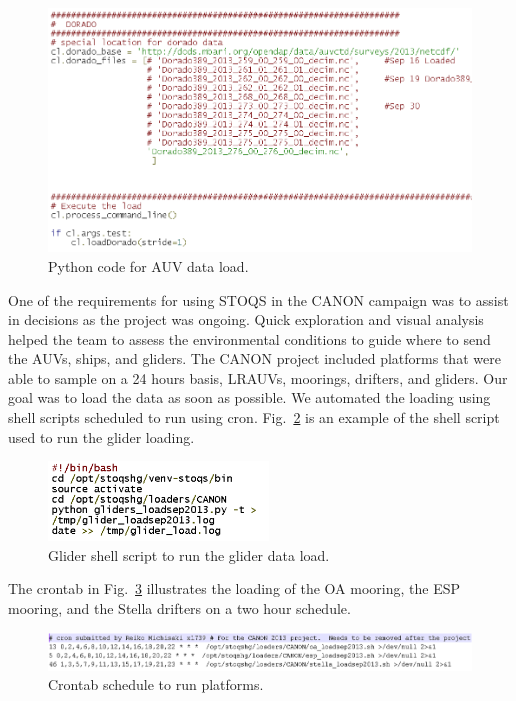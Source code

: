 \begin{figure}[htbp]
\centering
\includegraphics[width=6.6in]{ReikoFigure7.png}
\caption{Python code for AUV data load.}
\label{fig:ReikoFigure7}
\end{figure}

One of the requirements for using STOQS in the CANON campaign was to assist in decisions as the project was ongoing. Quick exploration and visual analysis helped the team to assess the environmental conditions to guide where to send the AUVs, ships, and gliders.  The CANON project included platforms that were able to sample on a 24 hours basis, LRAUVs, moorings, drifters, and gliders.  Our goal was to load the data as soon as possible. We automated the loading using shell scripts scheduled to run using cron.  Fig.~\ref{fig:ReikoFigure8} is an example of the shell script used to run the glider loading.


\begin{figure}[htbp]
\centering
\includegraphics[width=2.3in]{ReikoFigure8.png}
\caption{Glider shell script to run the glider data load.}
\label{fig:ReikoFigure8}
\end{figure}

The crontab in Fig.~\ref{fig:ReikoFigure9} illustrates the loading of the OA mooring, the ESP mooring, and the Stella drifters on a two hour schedule.

\begin{figure}[htbp]
\centering
\includegraphics[width=6.6in]{ReikoFigure9.png}
\caption{Crontab schedule to run platforms.}
\label{fig:ReikoFigure9}
\end{figure}

